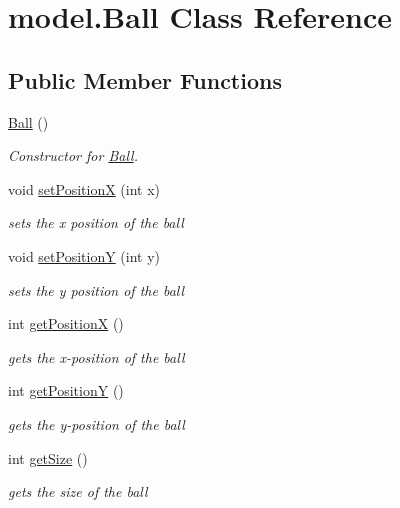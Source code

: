 \hypertarget{classmodel_1_1_ball}{}\section{model.\+Ball Class Reference}
\label{classmodel_1_1_ball}
\subsection*{Public Member Functions}
\begin{DoxyCompactItemize}
\item 
\hyperlink{classmodel_1_1_ball_a525ba73a7ce62c810a501d6194402cfc}{Ball} ()
\begin{DoxyCompactList}\small\item\em Constructor for \hyperlink{classmodel_1_1_ball}{Ball}. \end{DoxyCompactList}\item 
void \hyperlink{classmodel_1_1_ball_a14854352d44495abed0928ba16a0ac39}{set\+PositionX} (int x)
\begin{DoxyCompactList}\small\item\em sets the x position of the ball \end{DoxyCompactList}\item 
void \hyperlink{classmodel_1_1_ball_a8902ffdc71a7845ec246fedf586649c7}{set\+PositionY} (int y)
\begin{DoxyCompactList}\small\item\em sets the y position of the ball \end{DoxyCompactList}\item 
int \hyperlink{classmodel_1_1_ball_ad6a8f2229d4bdb3dd755443000eeacdf}{get\+PositionX} ()
\begin{DoxyCompactList}\small\item\em gets the x-\/position of the ball \end{DoxyCompactList}\item 
int \hyperlink{classmodel_1_1_ball_ae5509de430dc00bc02259294aa05c10d}{get\+PositionY} ()
\begin{DoxyCompactList}\small\item\em gets the y-\/position of the ball \end{DoxyCompactList}\item 
int \hyperlink{classmodel_1_1_ball_a46ca8051579a49ae750f965621534d5c}{get\+Size} ()
\begin{DoxyCompactList}\small\item\em gets the size of the ball \end{DoxyCompactList}\end{DoxyCompactItemize}
